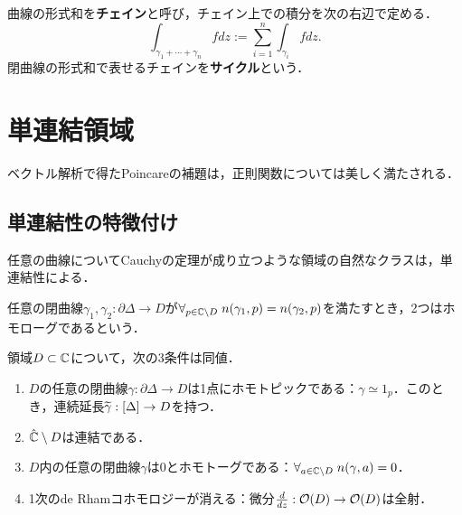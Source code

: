 \documentclass[uplatex, dvipdfmx]{jsreport}
\begin{document}
\begin{definition}
    曲線の形式和を\textbf{チェイン}と呼び，チェイン上での積分を次の右辺で定める．
    \[\int_{\gamma_1+\cdots+\gamma_n}fdz:=\sum_{i=1}^n\int_{\gamma_i}fdz.\]
    閉曲線の形式和で表せるチェインを\textbf{サイクル}という．
\end{definition}

\section{単連結領域}

\begin{tcolorbox}[colframe=ForestGreen, colback=ForestGreen!10!white,breakable,colbacktitle=ForestGreen!40!white,coltitle=black,fonttitle=\bfseries\sffamily,
title=]
    ベクトル解析で得たPoincareの補題は，正則関数については美しく満たされる．
\end{tcolorbox}

\subsection{単連結性の特徴付け}

\begin{tcolorbox}[colframe=ForestGreen, colback=ForestGreen!10!white,breakable,colbacktitle=ForestGreen!40!white,coltitle=black,fonttitle=\bfseries\sffamily,
title=]
    任意の曲線についてCauchyの定理が成り立つような領域の自然なクラスは，単連結性による．
\end{tcolorbox}

\begin{definition}[homologue]
    任意の閉曲線$\gamma_1,\gamma_2:\partial\Delta\to D$が$\forall_{p\in\mathbb{C}\setminus D}\;n(\gamma_1,p)=n(\gamma_2,p)$を満たすとき，2つはホモローグであるという．
\end{definition}

\begin{theorem}
    領域$D\subset\mathbb{C}$について，次の3条件は同値．
    \begin{enumerate}
        \item $D$の任意の閉曲線$\gamma:\partial\Delta\to D$は1点にホモトピックである：$\gamma\simeq 1_p$．このとき，連続延長$\widetilde{\gamma}:[\Delta]\to D$を持つ．
        \item $\hat{\mathbb{C}}\setminus D$は連結である．
        \item $D$内の任意の閉曲線$\gamma$は$0$とホモトーグである：$\forall_{a\in\mathbb{C}\setminus D}\;n(\gamma,a)=0$．
        \item 1次のde Rhamコホモロジーが消える：微分$\frac{d }{d z}:\mathcal{O}(D)\to\mathcal{O}(D)$は全射．
    \end{enumerate}
\end{theorem}
\end{document}
